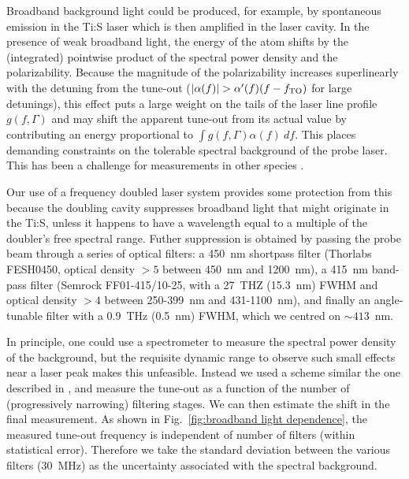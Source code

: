 	Broadband background light could be produced, for example, by  spontaneous emission in the Ti:S laser which is then amplified in the laser cavity. 
	In the presence of weak broadband light, the energy of the atom shifts by the (integrated) pointwise product of the spectral power density and the polarizability. 
	Because the magnitude of the polarizability increases superlinearly with the detuning from the tune-out ($|\alpha(f)| > \alpha'(f) (f-f_\mathrm{TO})$ for large detunings), this effect puts a large weight on the tails of the laser line profile $g(f,\Gamma)$ and may shift the apparent tune-out from its actual value by contributing an energy proportional to $\int g(f,\Gamma)\alpha(f)~df$. 
	This places demanding constraints on the tolerable spectral background of the probe laser. 
	This has been a challenge for measurements in other species \cite{HolmgrenThesis}. 
	
	Our use of a frequency doubled laser system provides some protection from this because the doubling cavity suppresses broadband light that might originate in the Ti:S, unless it happens to have a wavelength equal to a multiple of the doubler's free spectral range. 
	Futher suppression is obtained by passing the probe beam through a series of optical filters: a 450~nm shortpass filter (Thorlabs FESH0450, optical density $>5$ between 450~nm and 1200~nm), a 415~nm band-pass filter (Semrock FF01-415/10-25, with a 27~THZ (15.3~nm) FWHM and optical density $>4$ between 250-399~nm and 431-1100~nm), and finally an angle-tunable filter with a 0.9~THz (0.5~nm) FWHM, which we centred on \(\sim 413\)~nm.

	In principle, one could use a spectrometer to measure the spectral power density of the background, but the requisite dynamic range to observe such small effects near a laser peak makes this unfeasible.
	Instead we used a scheme similar the one described in \cite{Leonard15}, and measure the tune-out as a function of the number of (progressively narrowing) filtering stages.
	We can then estimate the shift in the  final measurement. 
	As shown in Fig.~\ref{fig:broadband light dependence},  the measured tune-out frequency is independent of number of filters (within statistical error). 
	Therefore we take the standard deviation between the various filters (\(30\)~MHz)  as the uncertainty associated with the spectral background.
	 




